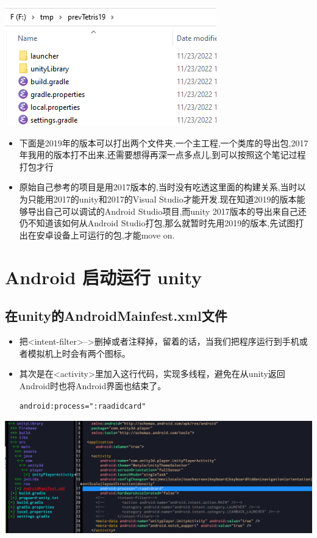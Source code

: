 \documentclass[9pt, b5paper]{article}
\begin{document}
\includegraphics[width=.9\linewidth]{./pic/unityToAndroid_20221123_222322.png}
\begin{itemize}
\item 下面是2019年的版本可以打出两个文件夹,一个主工程,一个类库的导出包,2017年我用的版本打不出来,还需要想得再深一点多点儿,到可以按照这个笔记过程打包才行
\item 原始自己参考的项目是用2017版本的,当时没有吃透这里面的构建关系,当时以为只能用2017的unity和2017的Visual Studio才能开发.现在知道2019的版本能够导出自己可以调试的Android Studio项目,而unity 2017版本的导出来自己还仍不知道该如何从Android Studio打包,那么就暂时先用2019的版本,先试图打出在安卓设备上可运行的包,才能move on.
\end{itemize}

\section{Android  启动运行 unity}
\label{sec-4}
\subsection{在unity的AndroidMainfest.xml文件}
\label{sec-4-1}
\begin{itemize}
\item 把<intent-filter>-->删掉或者注释掉，留着的话，当我们把程序运行到手机或者模拟机上时会有两个图标。
\item 其次是在<activity>里加入这行代码，实现多线程，避免在从unity返回Android时也将Android界面也结束了。
\begin{verbatim}
android:process=":raadidcard"
\end{verbatim}
\end{itemize}

\includegraphics[width=.9\linewidth]{./pic/unityToAndroid_20221123_223227.png}
\end{document}
